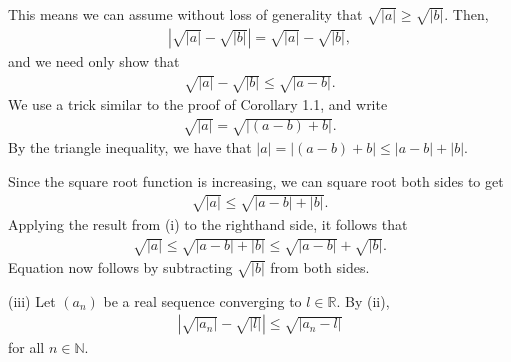 \documentclass[letterpaper,10pt,english]{jupyterBook}
\begin{document}
\sphinxAtStartPar
This means we can assume without loss of generality that \(\sqrt{|a|}\geq\sqrt{|b|}\). Then,
\begin{equation*}
\begin{split}
\left|\sqrt{|a|} - \sqrt{|b|}\right| = \sqrt{|a|}-\sqrt{|b|},
\end{split}
\end{equation*}
\sphinxAtStartPar
and we need only show that
\begin{equation}\label{equation:Solutions-full:eq:sqrta-sqrtb}
\begin{split}\sqrt{|a|} - \sqrt{|b|} \leq \sqrt{|a - b|}.\end{split}
\end{equation}
\sphinxAtStartPar
We use a trick similar to the proof of Corollary 1.1, and write
\begin{equation*}
\begin{split}
\sqrt{|a|} = \sqrt{\big|(a-b) + b\big|}.
\end{split}
\end{equation*}
\sphinxAtStartPar
By the triangle inequality, we have that \(|a| = \big|(a-b) + b\big| \leq |a-b|+|b|\).

\sphinxAtStartPar
Since the square root function is increasing, we can square root both sides to get
\begin{equation*}
\begin{split}
\sqrt{|a|} \leq \sqrt{|a-b|+|b|}.
\end{split}
\end{equation*}
\sphinxAtStartPar
Applying the result from (i) to the right\sphinxhyphen{}hand side, it follows that
\begin{equation*}
\begin{split}
\sqrt{|a|} \leq \sqrt{|a-b|+|b|} \leq \sqrt{|a-b|}+\sqrt{|b|}.
\end{split}
\end{equation*}
\sphinxAtStartPar
Equation {\hyperref[\detokenize{Solutions-full:equation-eq-sqrta-sqrtb}]{}} now follows by subtracting \(\sqrt{|b|}\) from both sides.

\sphinxAtStartPar
(iii) Let \((a_n)\) be a real sequence converging to \(l\in\mathbb{R}\). By (ii),
\begin{equation*}
\begin{split}
\left|\sqrt{|a_{n}|}-\sqrt{|l|}\right| \leq \sqrt{\big|a_n-l\big|}
\end{split}
\end{equation*}
\sphinxAtStartPar
for all \(n\in\mathbb{N}\).
\end{document}
